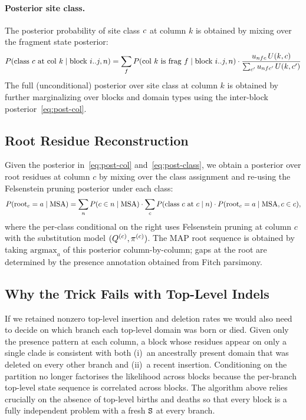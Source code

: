 \paragraph{Posterior site class.}
The posterior probability of site class $c$ at column $k$ is
obtained by mixing over the fragment state posterior:
\begin{equation}
P(\text{class } c \text{ at col } k \mid \text{block } i..j, n)
= \sum_{f} P(\text{col } k \text{ is frag } f \mid \text{block } i..j, n)
\cdot \frac{u_{nfc}\, U(k, c)}
           {\sum_{c'} u_{nfc'}\, U(k, c')}
\label{eq:post-class}
\end{equation}
The full (unconditional) posterior over site class at column $k$ is
obtained by further marginalizing over blocks and domain types using the
inter-block posterior~\eqref{eq:post-col}.

\subsection{Root Residue Reconstruction}
\label{sec:root-residue}

Given the posterior in~\eqref{eq:post-col} and~\eqref{eq:post-class},
we obtain a posterior over root residues at column $c$ by mixing over
the class assignment and re-using the Felsenstein pruning posterior
under each class:
\begin{equation}
  P(\text{root}_c = a \mid \text{MSA}) =
  \sum_{n} P(c \in n \mid \text{MSA}) \cdot
  \sum_{c} P(\text{class } c \text{ at } c \mid n) \cdot
  P(\text{root}_c = a \mid \text{MSA}, c \in c),
  \label{eq:root-post}
\end{equation}
where the per-class conditional on the right uses Felsenstein pruning
at column $c$ with the substitution model $(Q^{(c)}, \pi^{(c)})$.
The MAP root sequence is obtained by taking $\mbox{argmax}_a$ of this
posterior column-by-column; gaps at the root are determined by the
presence annotation obtained from Fitch parsimony.

\subsection{Why the Trick Fails with Top-Level Indels}

If we retained nonzero top-level insertion and deletion rates we would
also need to decide on which branch each top-level domain was born or
died. Given only the presence pattern at each column, a block whose
residues appear on only a single clade is consistent with both (i)~an
ancestrally present domain that was deleted on every other branch and
(ii)~a recent insertion. Conditioning on the partition no longer
factorises the likelihood across blocks because the per-branch
top-level state sequence is correlated across blocks. The
algorithm above relies crucially on the absence of
top-level births and deaths so that every block is a fully independent
problem with a fresh ${\tt S}$ at every branch.


